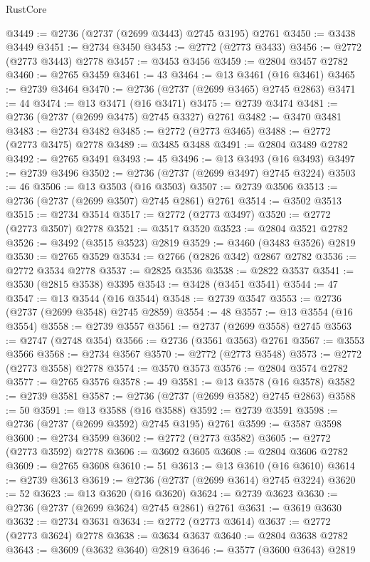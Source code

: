 \begin{lexlean}{RustCore}
\begin{coremodule}
@3449 := @2736 (@2737 (@2699 @3443) @2745 @3195) @2761
@3450 := @3438 @3449
@3451 := @2734 @3450
@3453 := @2772 (@2773 @3433)
@3456 := @2772 (@2773 @3443) @2778
@3457 := @3453 @3456
@3459 := @2804 @3457 @2782
@3460 := @2765 @3459
@3461 := 43
@3464 := @13 @3461 (@16 @3461)
@3465 := @2739 @3464
@3470 := @2736 (@2737 (@2699 @3465) @2745 @2863)
@3471 := 44
@3474 := @13 @3471 (@16 @3471)
@3475 := @2739 @3474
@3481 := @2736 (@2737 (@2699 @3475) @2745 @3327) @2761
@3482 := @3470 @3481
@3483 := @2734 @3482
@3485 := @2772 (@2773 @3465)
@3488 := @2772 (@2773 @3475) @2778
@3489 := @3485 @3488
@3491 := @2804 @3489 @2782
@3492 := @2765 @3491
@3493 := 45
@3496 := @13 @3493 (@16 @3493)
@3497 := @2739 @3496
@3502 := @2736 (@2737 (@2699 @3497) @2745 @3224)
@3503 := 46
@3506 := @13 @3503 (@16 @3503)
@3507 := @2739 @3506
@3513 := @2736 (@2737 (@2699 @3507) @2745 @2861) @2761
@3514 := @3502 @3513
@3515 := @2734 @3514
@3517 := @2772 (@2773 @3497)
@3520 := @2772 (@2773 @3507) @2778
@3521 := @3517 @3520
@3523 := @2804 @3521 @2782
@3526 := @3492 (@3515 @3523) @2819
@3529 := @3460 (@3483 @3526) @2819
@3530 := @2765 @3529
@3534 := @2766 (@2826 @342) @2867 @2782
@3536 := @2772 @3534 @2778
@3537 := @2825 @3536
@3538 := @2822 @3537
@3541 := @3530 (@2815 @3538) @3395
@3543 := @3428 (@3451 @3541)
@3544 := 47
@3547 := @13 @3544 (@16 @3544)
@3548 := @2739 @3547
@3553 := @2736 (@2737 (@2699 @3548) @2745 @2859)
@3554 := 48
@3557 := @13 @3554 (@16 @3554)
@3558 := @2739 @3557
@3561 := @2737 (@2699 @3558) @2745
@3563 := @2747 (@2748 @354)
@3566 := @2736 (@3561 @3563) @2761
@3567 := @3553 @3566
@3568 := @2734 @3567
@3570 := @2772 (@2773 @3548)
@3573 := @2772 (@2773 @3558) @2778
@3574 := @3570 @3573
@3576 := @2804 @3574 @2782
@3577 := @2765 @3576
@3578 := 49
@3581 := @13 @3578 (@16 @3578)
@3582 := @2739 @3581
@3587 := @2736 (@2737 (@2699 @3582) @2745 @2863)
@3588 := 50
@3591 := @13 @3588 (@16 @3588)
@3592 := @2739 @3591
@3598 := @2736 (@2737 (@2699 @3592) @2745 @3195) @2761
@3599 := @3587 @3598
@3600 := @2734 @3599
@3602 := @2772 (@2773 @3582)
@3605 := @2772 (@2773 @3592) @2778
@3606 := @3602 @3605
@3608 := @2804 @3606 @2782
@3609 := @2765 @3608
@3610 := 51
@3613 := @13 @3610 (@16 @3610)
@3614 := @2739 @3613
@3619 := @2736 (@2737 (@2699 @3614) @2745 @3224)
@3620 := 52
@3623 := @13 @3620 (@16 @3620)
@3624 := @2739 @3623
@3630 := @2736 (@2737 (@2699 @3624) @2745 @2861) @2761
@3631 := @3619 @3630
@3632 := @2734 @3631
@3634 := @2772 (@2773 @3614)
@3637 := @2772 (@2773 @3624) @2778
@3638 := @3634 @3637
@3640 := @2804 @3638 @2782
@3643 := @3609 (@3632 @3640) @2819
@3646 := @3577 (@3600 @3643) @2819

\end{coremodule}
\end{lexlean}
